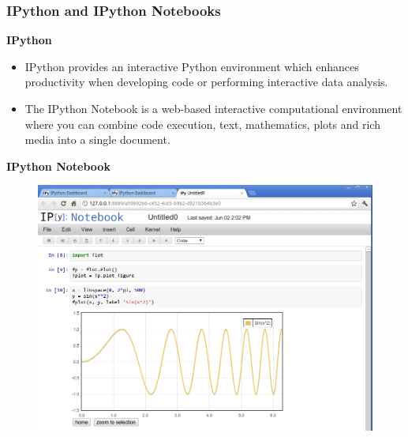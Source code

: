\documentclass[MASTER.tex]{subfiles}
\begin{document}
	
%
%
%
%
\begin{frame}
\frametitle{IPython and IPython Notebooks}
\textbf{IPython}
\begin{itemize}
\item IPython provides an interactive Python environment which enhances productivity when developing code
or performing interactive data analysis.
\item

The IPython Notebook is a web-based interactive computational environment where you can combine code execution, text, mathematics, plots and rich media into a single document.

\end{itemize}
\Large
\end{frame}
\begin{frame}
\textbf{IPython Notebook}
	\begin{figure}
\centering
\includegraphics[width=0.99\linewidth]{vk2Q6}

\end{figure}

\end{frame}
\end{document}
